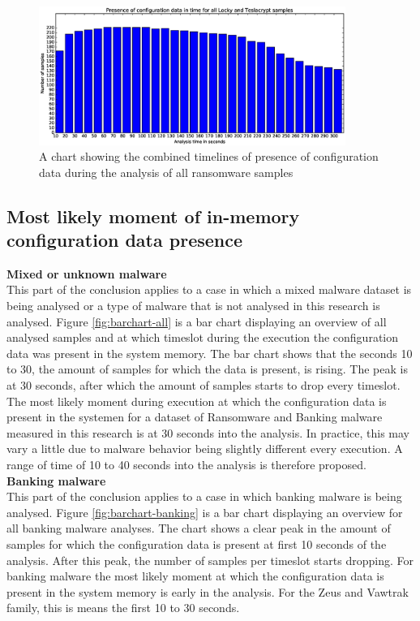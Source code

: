 \documentclass[conference]{IEEEtran}
\begin{document}
\begin{figure}[!h]
    \includegraphics[width=10cm,scale=0.5]{images/final/ransomware-barchart.eps}
    \caption{A chart showing the combined timelines of presence of configuration data during the analysis of all ransomware samples}
    \label{fig:barchart-ransom}
\end{figure}

\newpage

\subsection{Most likely moment of in-memory configuration data presence}

\textbf{Mixed or unknown malware}\\
This part of the conclusion applies to a case in which a mixed malware dataset is being analysed or a type of malware that is not analysed in this research is analysed. Figure \ref{fig:barchart-all} is a bar chart displaying an overview of all analysed samples and at which timeslot during the execution the configuration data was present in the system memory. The bar chart shows that the seconds 10 to 30, the amount of samples for which the data is present, is rising. The peak is at 30 seconds, after which the amount of samples starts to drop every timeslot. The most likely moment during execution at which the configuration data is present in the systemen for a dataset of Ransomware and Banking malware measured in this research is at 30 seconds into the analysis. In practice, this may vary a little due to malware behavior being slightly different every execution. A range of time of 10 to 40 seconds into the analysis is therefore proposed.\\

\textbf{Banking malware}\\
This part of the conclusion applies to a case in which banking malware is being analysed. Figure \ref{fig:barchart-banking} is a bar chart displaying an overview for all banking malware analyses. The chart shows a clear peak in the amount of samples for which the configuration data is present at first 10 seconds of the analysis. After this peak, the number of samples per timeslot starts dropping. For banking malware the most likely moment at which the configuration data is present in the system memory is early in the analysis. For the Zeus and Vawtrak family, this is means the first 10 to 30 seconds.\\
\end{document}
